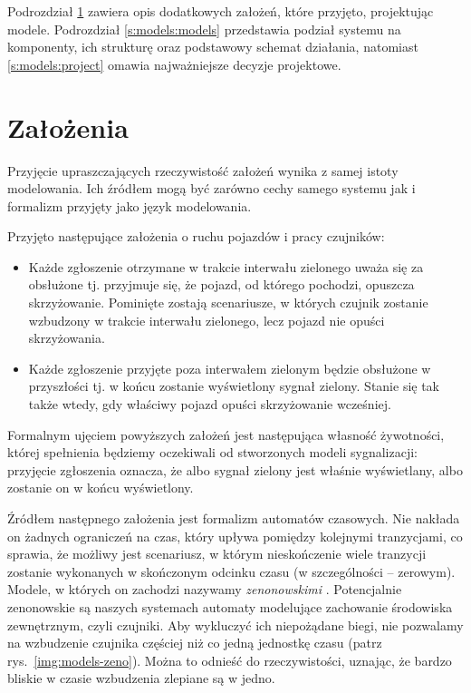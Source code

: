 \documentclass{pracamgr}
\newcommand{\imgr}[1]{rys.~\ref{#1}}
\theoremstyle{plain}
\begin{document}
Podrozdział \ref{s:models:assumptions} zawiera opis dodatkowych
założeń, które przyjęto, projektując modele. Podrozdział
\ref{s:models:models} przedstawia podział systemu na komponenty, ich
strukturę oraz podstawowy schemat działania, natomiast
\ref{s:models:project} omawia najważniejsze decyzje projektowe.

\section{Założenia}
\label{s:models:assumptions}

Przyjęcie upraszczających rzeczywistość założeń wynika z samej istoty
modelowania. Ich źródłem mogą być zarówno cechy samego systemu jak i
formalizm przyjęty jako język modelowania.

Przyjęto następujące założenia o ruchu pojazdów i pracy czujników:
\begin{itemize}
  \item Każde zgłoszenie otrzymane w trakcie interwału zielonego uważa
  się za obsłużone tj. przyjmuje się, że pojazd, od którego pochodzi,
  opuszcza skrzyżowanie. Pominięte zostają scenariusze, w których
  czujnik zostanie wzbudzony w trakcie interwału zielonego, lecz
  pojazd nie opuści skrzyżowania.
  \item Każde zgłoszenie przyjęte poza interwałem zielonym będzie
  obsłużone w przyszłości tj. w końcu zostanie wyświetlony sygnał
  zielony. Stanie się tak także wtedy, gdy właściwy pojazd opuści
  skrzyżowanie wcześniej. 
\end{itemize}
Formalnym ujęciem powyższych założeń jest następująca własność
żywotności, której spełnienia będziemy oczekiwali od stworzonych
modeli sygnalizacji: przyjęcie zgłoszenia oznacza, że albo sygnał
zielony jest właśnie wyświetlany, albo zostanie on w końcu
wyświetlony.

Źródłem następnego założenia jest formalizm automatów czasowych. Nie
nakłada on żadnych ograniczeń na czas, który upływa pomiędzy kolejnymi
tranzycjami, co sprawia, że możliwy jest scenariusz, w którym
nieskończenie wiele tranzycji zostanie wykonanych w skończonym odcinku
czasu (w szczególności -- zerowym). Modele, w których on zachodzi
nazywamy \emph{zenonowskimi} \cite{henz-94}.  Potencjalnie zenonowskie
są naszych systemach automaty modelujące zachowanie środowiska
zewnętrznym, czyli czujniki. Aby wykluczyć ich niepożądane biegi, nie
pozwalamy na wzbudzenie czujnika częściej niż co jedną jednostkę czasu
(patrz \imgr{img:models-zeno}). Można to odnieść do rzeczywistości,
uznając, że bardzo bliskie w czasie wzbudzenia zlepiane są w jedno.
\end{document}
